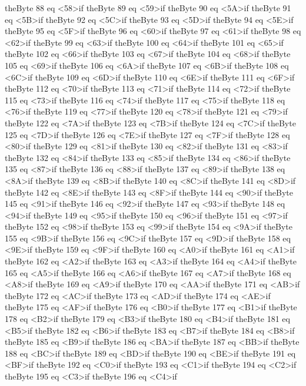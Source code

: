 {theByte 88 eq {<58>}if
theByte 89 eq {<59>}if
theByte 90 eq {<5A>}if
theByte 91 eq {<5B>}if
theByte 92 eq {<5C>}if
theByte 93 eq {<5D>}if
theByte 94 eq {<5E>}if
theByte 95 eq {<5F>}if
theByte 96 eq  {<60>}if
theByte 97 eq  {<61>}if
theByte 98 eq  {<62>}if
theByte 99 eq  {<63>}if
theByte 100 eq {<64>}if
theByte 101 eq {<65>}if
theByte 102 eq {<66>}if
theByte 103 eq {<67>}if
theByte 104 eq {<68>}if
theByte 105 eq {<69>}if
theByte 106 eq {<6A>}if
theByte 107 eq {<6B>}if
theByte 108 eq {<6C>}if
theByte 109 eq {<6D>}if
theByte 110 eq {<6E>}if
theByte 111 eq {<6F>}if
theByte 112 eq {<70>}if
theByte 113 eq {<71>}if
theByte 114 eq {<72>}if
theByte 115 eq {<73>}if
theByte 116 eq {<74>}if
theByte 117 eq {<75>}if
theByte 118 eq {<76>}if
theByte 119 eq {<77>}if
theByte 120 eq {<78>}if
theByte 121 eq {<79>}if
theByte 122 eq {<7A>}if
theByte 123 eq {<7B>}if
theByte 124 eq {<7C>}if
theByte 125 eq {<7D>}if
theByte 126 eq {<7E>}if
theByte 127 eq {<7F>}if
theByte 128 eq {<80>}if
theByte 129 eq {<81>}if
theByte 130 eq {<82>}if
theByte 131 eq {<83>}if
theByte 132 eq {<84>}if
theByte 133 eq {<85>}if
theByte 134 eq {<86>}if
theByte 135 eq {<87>}if
theByte 136 eq {<88>}if
theByte 137 eq {<89>}if
theByte 138 eq {<8A>}if
theByte 139 eq {<8B>}if
theByte 140 eq {<8C>}if
theByte 141 eq {<8D>}if
theByte 142 eq {<8E>}if
theByte 143 eq {<8F>}if
theByte 144 eq {<90>}if
theByte 145 eq {<91>}if
theByte 146 eq {<92>}if
theByte 147 eq {<93>}if
theByte 148 eq {<94>}if
theByte 149 eq {<95>}if
theByte 150 eq {<96>}if
theByte 151 eq {<97>}if
theByte 152 eq {<98>}if
theByte 153 eq {<99>}if
theByte 154 eq {<9A>}if
theByte 155 eq {<9B>}if
theByte 156 eq {<9C>}if
theByte 157 eq {<9D>}if
theByte 158 eq {<9E>}if
theByte 159 eq {<9F>}if
theByte 160 eq {<A0>}if
theByte 161 eq {<A1>}if
theByte 162 eq {<A2>}if
theByte 163 eq {<A3>}if
theByte 164 eq {<A4>}if
theByte 165 eq {<A5>}if
theByte 166 eq {<A6>}if
theByte 167 eq {<A7>}if
theByte 168 eq {<A8>}if
theByte 169 eq {<A9>}if
theByte 170 eq {<AA>}if
theByte 171 eq {<AB>}if
theByte 172 eq {<AC>}if
theByte 173 eq {<AD>}if
theByte 174 eq {<AE>}if
theByte 175 eq {<AF>}if
theByte 176 eq {<B0>}if
theByte 177 eq {<B1>}if
theByte 178 eq {<B2>}if
theByte 179 eq {<B3>}if
theByte 180 eq {<B4>}if
theByte 181 eq {<B5>}if
theByte 182 eq {<B6>}if
theByte 183 eq {<B7>}if
theByte 184 eq {<B8>}if
theByte 185 eq {<B9>}if
theByte 186 eq {<BA>}if
theByte 187 eq {<BB>}if
theByte 188 eq {<BC>}if
theByte 189 eq {<BD>}if
theByte 190 eq {<BE>}if
theByte 191 eq {<BF>}if
theByte 192 eq {<C0>}if
theByte 193 eq {<C1>}if
theByte 194 eq {<C2>}if
theByte 195 eq {<C3>}if
theByte 196 eq {<C4>}if
}
